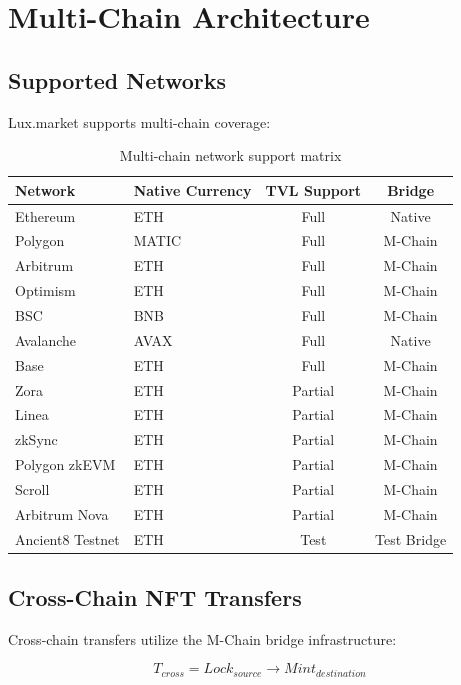 \section{Multi-Chain Architecture}


\subsection{Supported Networks}

Lux.market supports multi-chain coverage:

\begin{table}[h]
\centering
\begin{tabular}{|l|l|c|c|}
\hline
\textbf{Network} & \textbf{Native Currency} & \textbf{TVL Support} & \textbf{Bridge} \\
\hline
Ethereum & ETH & Full & Native \\
Polygon & MATIC & Full & M-Chain \\
Arbitrum & ETH & Full & M-Chain \\
Optimism & ETH & Full & M-Chain \\
BSC & BNB & Full & M-Chain \\
Avalanche & AVAX & Full & Native \\
Base & ETH & Full & M-Chain \\
Zora & ETH & Partial & M-Chain \\
Linea & ETH & Partial & M-Chain \\
zkSync & ETH & Partial & M-Chain \\
Polygon zkEVM & ETH & Partial & M-Chain \\
Scroll & ETH & Partial & M-Chain \\
Arbitrum Nova & ETH & Partial & M-Chain \\
Ancient8 Testnet & ETH & Test & Test Bridge \\
\hline
\end{tabular}
\caption{Multi-chain network support matrix}
\end{table}

\subsection{Cross-Chain NFT Transfers}

Cross-chain transfers utilize the M-Chain bridge infrastructure:

\begin{equation}
T_{cross} = Lock_{source} \rightarrow Mint_{destination}
\end{equation}

